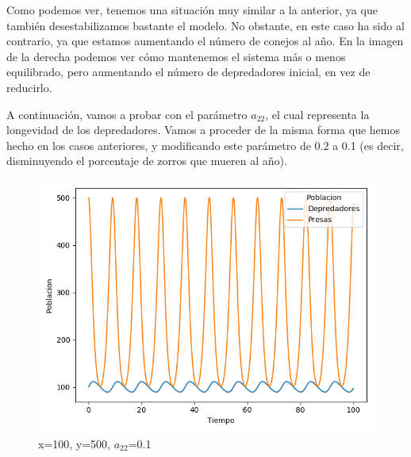 \documentclass[11pt,a4paper]{article}
\begin{document}
Como podemos ver, tenemos una situación muy similar a la anterior, ya que también desestabilizamos bastante el modelo. No obstante, en este caso
ha sido al contrario, ya que estamos aumentando el número de conejos al año. En la imagen de la derecha podemos ver cómo mantenemos el sistema
más o menos equilibrado, pero aumentando el número de depredadores inicial, en vez de reducirlo.

A continuación, vamos a probar con el parámetro $a_{22}$, el cual representa la longevidad de los depredadores. Vamos a proceder de la misma forma
que hemos hecho en los casos anteriores, y modificando este parámetro de 0.2 a 0.1 (es decir, disminuyendo el porcentaje de zorros que mueren al año).
\begin{figure}[H]
	\centering
	\includegraphics[scale=0.4]{img/4-a22-100-500.png}
	\caption{x=100, y=500, $a_{22}$=0.1}
\end{figure}
\end{document}
